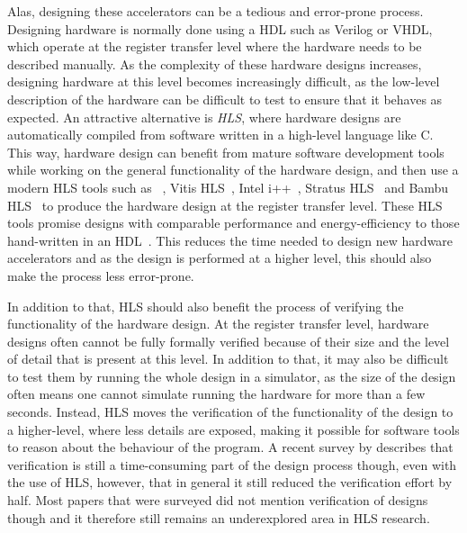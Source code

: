 Alas, designing these accelerators can be a tedious and error-prone process.
Designing hardware is normally done using a \gls{HDL} such as Verilog or VHDL,
which operate at the register transfer level where the hardware needs to be
described manually.  As the complexity of these hardware designs increases,
designing hardware at this level becomes increasingly difficult, as the
low-level description of the hardware can be difficult to test to ensure that it
behaves as expected.  An attractive alternative is \emph{\gls{HLS}}, where
hardware designs are automatically compiled from software written in a
high-level language like C.  This way, hardware design can benefit from mature
software development tools while working on the general functionality of the
hardware design, and then use a modern \gls{HLS} tools such as
\legup{}~\cite{canis11_legup}, Vitis HLS~\cite{amd23_vitis_high_synth}, Intel
i++~\cite{intel_hls}, Stratus HLS~\cite{roane23_autom_hw_sw_co_desig} and Bambu
HLS~\cite{bambu_hls} to produce the hardware design at the register transfer
level.  These \gls{HLS} tools promise designs with comparable performance and
energy-efficiency to those hand-written in an \gls{HDL}~\cite{homsirikamol+14,
  silexicahlshdl, 7818341}.  This reduces the time needed to design new hardware
accelerators and as the design is performed at a higher level, this should also
make the process less error-prone.

In addition to that, \gls{HLS} should also benefit the process of verifying the
functionality of the hardware design.  At the register transfer level, hardware
designs often cannot be fully formally verified because of their size and the
level of detail that is present at this level.  In addition to that, it may also
be difficult to test them by running the whole design in a simulator, as the
size of the design often means one cannot simulate running the hardware for more
than a few seconds.  Instead, \gls{HLS} moves the verification of the
functionality of the design to a higher-level, where less details are exposed,
making it possible for software tools to reason about the behaviour of the
program.  A recent survey by \textcite{lahti19_are_we_there_yet} describes that
verification is still a time-consuming part of the design process though, even
with the use of \gls{HLS}, however, that in general it still reduced the
verification effort by half.  Most papers that were surveyed did not mention
verification of designs though and it therefore still remains an underexplored
area in \gls{HLS} research.

